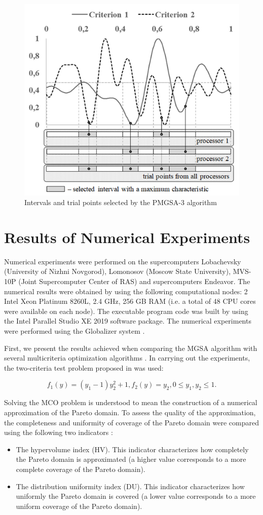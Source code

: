 \documentclass[review]{elsarticle}
\begin{document}
\begin{figure}
  \centering
  \includegraphics[width=0.7\linewidth]{fig4}
  \caption{Intervals and trial points selected by the PMGSA-3 algorithm}
  \label{fig:4}
\end{figure}

\section{Results of Numerical Experiments}\label{sec:5}

Numerical experiments were performed on the supercomputers Lobachevsky (University of Nizhni Novgorod), Lomonosov (Moscow State University), MVS-10P (Joint Supercomputer Center of RAS) and supercomputers Endeavor. The numerical results were obtained by using the following computational nodes: 2 Intel Xeon Platinum 8260L, 2.4 GHz, 256 GB RAM (i.e. a total of 48 CPU cores were available on each node). The executable program code was built by using the Intel Parallel Studio XE 2019 software package. The numerical experiments were performed using the Globalizer system \cite{c40}.

First, we present the results achieved when comparing the MGSA algorithm with several multicriteria optimization algorithms \cite{c37}. In carrying out the experiments, the two-criteria test problem proposed in \cite{c36} was used:

\begin{equation}\label{eq:32}
f_1(y)=(y_1-1) y_2^2+1,f_2 (y)=y_2, 0 \leq y_1, y_2 \leq 1.
\end{equation}

Solving the MCO problem is understood to mean the construction of a numerical approximation of the Pareto domain. To assess the quality of the approximation, the completeness and uniformity of coverage of the Pareto domain were compared using the following two indicators \cite{c15,c36}:
\begin{itemize}
	 \item The hypervolume index (HV). This indicator characterizes how completely the Pareto domain is approximated (a higher value corresponds to a more complete coverage of the Pareto domain). 
	 \item The distribution uniformity index (DU). This indicator characterizes how uniformly the Pareto domain is covered (a lower value corresponds to a more uniform coverage of the Pareto domain).
\end{itemize}
\end{document}

